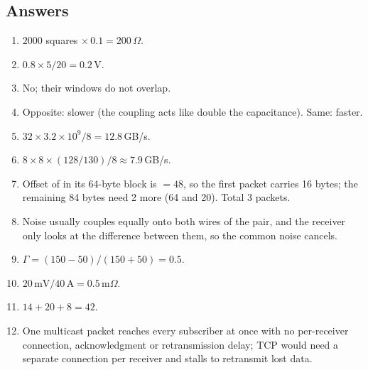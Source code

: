 \subsection*{Answers}
\begin{enumerate}
  \item $2000$ squares $\times\, 0.1 = 200\,\Omega$.
  \item $0.8 \times 5/20 = 0.2$\,V.
  \item No; their windows do not overlap.
  \item Opposite: slower (the coupling acts like double the capacitance). Same: faster.
  \item $32 \times 3.2\times10^9 / 8 = 12.8$\,GB/s.
  \item $8 \times 8 \times (128/130)/8 \approx 7.9$\,GB/s.
  \item Offset of  in its 64-byte block is  $= 48$, so the first packet carries 16 bytes; the remaining 84 bytes need 2 more (64 and 20). Total 3 packets.
  \item Noise usually couples equally onto both wires of the pair, and the receiver only looks at the difference between them, so the common noise cancels.
  \item $\Gamma = (150 - 50)/(150 + 50) = 0.5$.
  \item $20\,\text{mV}/40\,\text{A} = 0.5\,\text{m}\Omega$.
  \item $14 + 20 + 8 = 42$.
  \item One multicast packet reaches every subscriber at once with no per-receiver connection, acknowledgment or retransmission delay; TCP would need a separate connection per receiver and stalls to retransmit lost data.
\end{enumerate}
